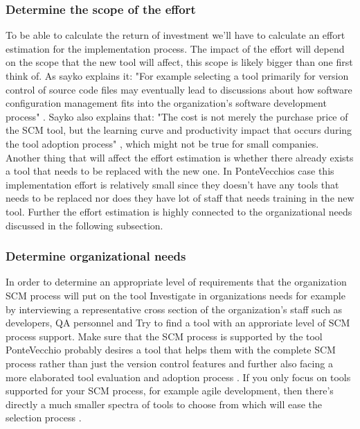 \documentclass[10pt]{article}
\begin{document}
\subsubsection{Determine the scope of the effort}
To be able to calculate the return of investment we'll have to calculate an effort estimation for the implementation process. The impact of the effort will depend on the scope that the new tool will affect, this scope is likely bigger than one first think of. As sayko explains it: "For example selecting a tool primarily for version control of source code files may eventually lead to discussions about how software configuration management fits into the organization's software development process" \cite{Sayko}. Sayko also explains that: "The cost is not merely the purchase price of the SCM tool, but the learning curve and productivity impact that occurs during the tool adoption process" \cite{Sayko}, which might not be true for small companies. Another thing that will affect the effort estimation is whether there already exists a tool that needs to be replaced with the new one. In PonteVecchios case this implementation effort is relatively small since they doesn't have any tools that needs to be replaced nor does they have lot of staff that needs training in the new tool. Further the effort estimation is highly connected to the organizational needs discussed in the following subsection.

\subsubsection{Determine organizational needs}
In order to determine an appropriate level of requirements that the organization SCM process will put on the tool  Investigate in organizations needs for example by interviewing a representative cross section of the organization's staff such as developers, QA personnel and 
Try to find a tool with an approriate level of SCM process support.
Make sure that the SCM process is supported by the tool
PonteVecchio probably desires a tool that helps them with the complete SCM process rather than just the version control features and further also facing a more elaborated tool evaluation and adoption process \cite{Sayko}. If you only focus on tools supported for your SCM process, for example agile development, then there's directly a much smaller spectra of tools to choose from which will ease the selection process \cite{Sayko}.
\end{document}
